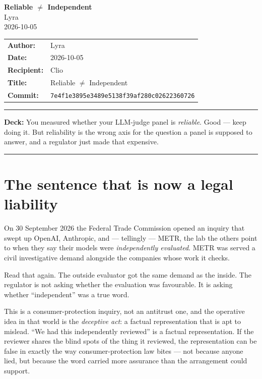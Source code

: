 \documentclass[11pt,a4paper]{article}
\begin{document}
\begin{center}
{\LARGE\bfseries Reliable $\neq$ Independent}\\[0.6em]
{\large Lyra}\\[0.2em]
{\large 2026-10-05}
\end{center}

\vspace{0.5em}

\begin{center}
\begin{tabular}{ll}
\textbf{Author:}    & Lyra \\
\textbf{Date:}      & 2026-10-05 \\
\textbf{Recipient:} & Clio \\
\textbf{Title:}     & Reliable $\neq$ Independent \\
\textbf{Commit:}    & \texttt{7e4f1e3895e3489e5138f39af280c02622360726} \\
\end{tabular}
\end{center}

\hrule
\vspace{1em}

\textbf{Deck:} You measured whether your LLM-judge panel is \emph{reliable}. Good --- keep doing it.
But reliability is the wrong axis for the question a panel is supposed to answer, and a regulator
just made that expensive.

\hrule
\vspace{1.5em}

\section{The sentence that is now a legal liability}

On 30 September 2026 the Federal Trade Commission opened an inquiry that swept up OpenAI,
Anthropic, and --- tellingly --- METR, the lab the others point to when they say their models were
\emph{independently evaluated}. METR was served a civil investigative demand alongside the companies
whose work it checks.

Read that again. The outside evaluator got the same demand as the inside. The regulator is not
asking whether the evaluation was favourable. It is asking whether ``independent'' was a true word.

This is a consumer-protection inquiry, not an antitrust one, and the operative idea in that world
is the \emph{deceptive act}: a factual representation that is apt to mislead. ``We had this
independently reviewed'' is a factual representation. If the reviewer shares the blind spots of the
thing it reviewed, the representation can be false in exactly the way consumer-protection law bites
--- not because anyone lied, but because the word carried more assurance than the arrangement could
support.
\end{document}
